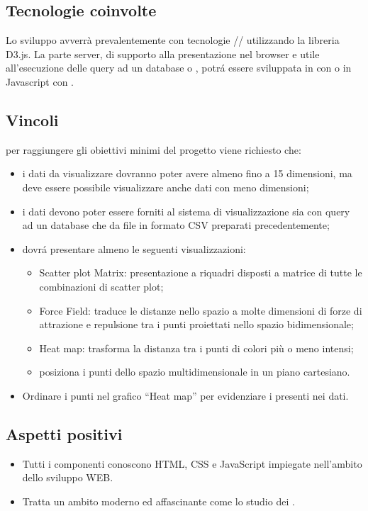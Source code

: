 \subsection{Tecnologie coinvolte}
Lo sviluppo avverrà prevalentemente con tecnologie // utilizzando la libreria D3.js.
La parte server, di supporto alla presentazione nel browser e utile all'esecuzione delle query ad un database  o , potr\'a essere sviluppata in  con  o in Javascript con .

\subsection{Vincoli}
per raggiungere gli obiettivi minimi del progetto viene richiesto che:
\begin{itemize}
	\item i dati da visualizzare dovranno poter avere almeno fino a 15 dimensioni, ma deve essere possibile visualizzare anche dati con meno dimensioni;
	\item i dati devono poter essere forniti al sistema di visualizzazione sia con query ad un database che da file in formato CSV preparati precedentemente;
	\item dovr\'a presentare almeno le seguenti visualizzazioni:
	\begin{itemize}
		\item Scatter plot Matrix: presentazione a riquadri disposti a matrice di tutte le combinazioni di scatter plot;
		\item Force Field: traduce le distanze nello spazio a molte dimensioni di forze di attrazione e repulsione tra i punti proiettati nello spazio bidimensionale;
		\item Heat map: trasforma la distanza tra i punti di colori più o meno intensi;
		\item posiziona i punti dello spazio multidimensionale in un piano
		cartesiano.
	\end{itemize}
	\item Ordinare i punti nel grafico “Heat map” per evidenziare i  presenti nei dati.
\end{itemize}

\subsection{Aspetti positivi}
\begin{itemize}
	\item Tutti i componenti conoscono HTML, CSS e JavaScript impiegate nell'ambito dello sviluppo WEB.
	\item Tratta un ambito moderno ed affascinante come lo studio dei .
\end{itemize}

